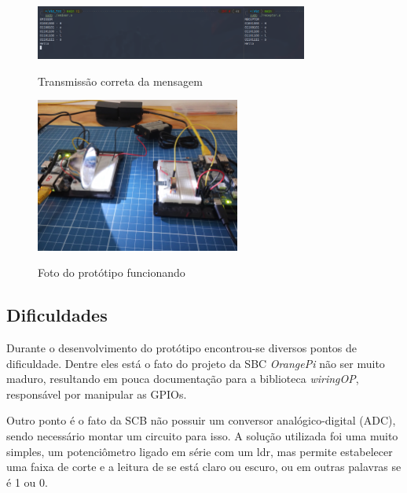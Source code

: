 \begin{figure}[!htbp]
  \caption{Transmissão correta da mensagem}
  \includegraphics[width=0.8\textwidth]{images/vlc_run.png}
  \label{vlc_funcionando}
\end{figure}

\begin{figure}[!htbp]
  \caption{Foto do protótipo funcionando}
  \includegraphics[width=0.6\textwidth]{images/vlc_funcionamento.jpg}
  \label{vlc_funcionando_foto}
\end{figure}


\subsection{Dificuldades}

Durante o desenvolvimento do protótipo encontrou-se diversos pontos de dificuldade. Dentre eles está o fato do projeto da SBC \textit{OrangePi} não ser muito maduro, resultando em pouca documentação para a biblioteca \textit{wiringOP}, responsável por manipular as GPIOs.

Outro ponto é o fato da SCB não possuir um conversor analógico-digital (ADC), sendo necessário montar um circuito para isso. A solução utilizada foi uma muito simples, um potenciômetro ligado em série com um ldr, mas permite estabelecer uma faixa de corte e a leitura de se está claro ou escuro, ou em outras palavras se é 1 ou 0.

